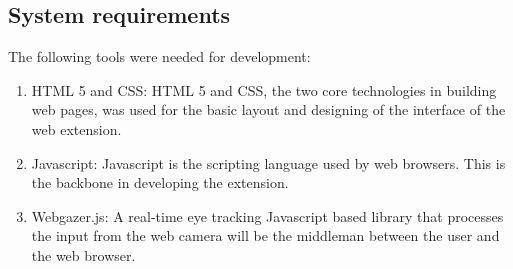 \documentclass[journal]{./IEEE/IEEEtran}
\begin{document}
\subsection{ System requirements}  \leavevmode
The following tools were needed for development:
\begin{enumerate}
\item HTML 5 and CSS: HTML 5 and CSS, the two core technologies in building web pages, \cite{htmlcssw3c} was  used for the basic layout and designing of the interface of the web extension.
\item Javascript: Javascript is the scripting language used by web browsers. This is the backbone in developing the  extension.
\item Webgazer.js: A real-time eye tracking Javascript based library that processes the input from the web camera will be the middleman between the user and the web browser. 
\end{enumerate}
 
\end{document}
